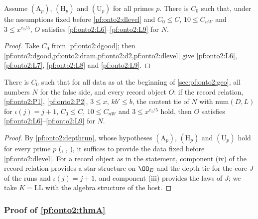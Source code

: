 \begin{corollary}\label{pf:onto2:depthrun}
Assume $(\mathrm A_p)$, $(\mathrm H_p)$ and $(\mathrm U_p)$ for all primes $p$. There is $C_0$ such that, under the assumptions fixed
before \cref{pf:onto2:dlevel} and $C_0\le C$, $10\le C_{nW}$ and $3\le x^{e_z/5}$, $O$ satisfies \ref{pf:onto2:L6}--\ref{pf:onto2:L9}
for $N$.
\end{corollary}

\begin{proof}
Take $C_0$ from \cref{pf:onto2:dgood}; then \cref{pf:onto2:dgood,pf:onto2:dram,pf:onto2:d2,pf:onto2:dlevel} give
\ref{pf:onto2:L6}, \ref{pf:onto2:L7}, \ref{pf:onto2:L8} and \ref{pf:onto2:L9}.
\end{proof}

\begin{proposition}\label{pf:onto2:depthall}
There is $C_0$ such that for all data as at the beginning of \cref{sec:pf:onto2:geo}, all numbers $N$ for the false side, and every
record object $O$: if the record relation, \ref{pf:onto2:P1}, \ref{pf:onto2:P2}, $3\le x$, $kb'\le b$, the content tie of $N$ with
$\mathrm{num}(D,L)$ for $\iota(j)=j+1$, $C_0\le C$, $10\le C_{nW}$ and $3\le x^{e_z/5}$ hold, then $O$ satisfies
\ref{pf:onto2:L6}--\ref{pf:onto2:L9} for $N$.
\end{proposition}

\begin{proof}
By \cref{pf:onto2:depthrun}, whose hypotheses $(\mathrm A_p)$, $(\mathrm H_p)$ and $(\mathrm U_p)$ hold for every prime $p$
(, ,
), it suffices to provide the data fixed before
\cref{pf:onto2:dlevel}. For a
record object as in the statement, component (iv) of the record relation provides a star structure on $\OO_E$ and the depth tie for
the core $J$ of the runs and $\iota(j)=j+1$, and component (iii) provides the laws of $J$; we take $K=\mathrm{LL}$ with the algebra
structure of the host.
\end{proof}

\subsubsection{Proof of \texorpdfstring{\cref{pf:onto2:thmA}}{Theorem A}}\label{sec:pf:onto2:geoproof}

